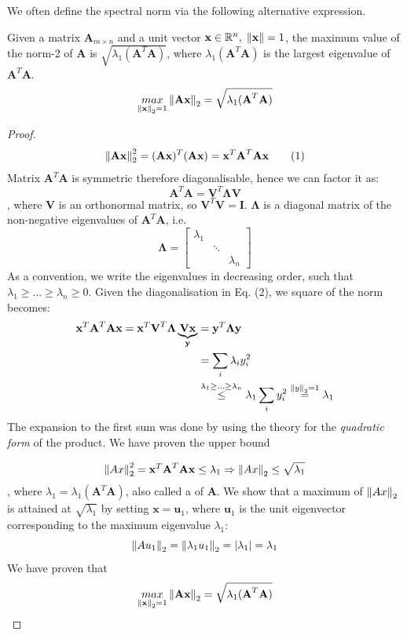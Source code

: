 \documentclass[a4paper]{article}
\begin{document}
We often define the spectral norm via the following alternative expression.
\begin{lemma}
Given a matrix $\textbf{A}_{m\times n}$ and a unit vector $\textbf{x} \in \mathbb{R}^n, \; \left\lVert\textbf{x}\right\rVert=1$, the maximum value of the norm-2 of $\textbf{A}$ is $\sqrt{\lambda_{1}(\textbf{A}^T\textbf{A})}$, where  $\lambda_{1}(\textbf{A}^T\textbf{A})$ is the largest eigenvalue of $\textbf{A}^T\textbf{A}$. 
\begin{equation}
    \underset{\left\lVert\textbf{x}\right\rVert_2=1}{max}\left\lVert\textbf{Ax}\right\rVert_2 = \sqrt{\lambda_{1}(\textbf{A}^T\textbf{A})}
\end{equation}
\end{lemma}
\begin{proof}
\[
\left\lVert\textbf{Ax}\right\rVert_2^2 = (\textbf{Ax})^T(\textbf{Ax})= \textbf{x}^T\textbf{A}^T\textbf{Ax}  \tag{1}
\]
Matrix $\textbf{A}^T\textbf{A}$ is symmetric therefore diagonalisable, hence we can factor it as:
\[
\textbf{A}^T\textbf{A} = \textbf{V}^T\boldsymbol{\Lambda}\textbf{V}   \tag{2}
\]
, where $\textbf{V}$ is an orthonormal matrix, so $\textbf{V}^T\textbf{V}= \textbf{I}$. $\boldsymbol{\Lambda}$ is a diagonal matrix of the non-negative eigenvalues of $\textbf{A}^T\textbf{A}$, i.e.
\[
\boldsymbol{\Lambda} =
\begin{bmatrix}
\lambda_1 & & \\
 & \ddots & \\
 & & \lambda_n
\end{bmatrix}
\]
As a convention, we write the eigenvalues in decreasing order, such that $\lambda_1\geq \ldots \geq \lambda_n \geq 0$. Given the diagonalisation in Eq. (2), we square of the norm becomes:
\[
\begin{split}
\textbf{x}^T\textbf{A}^T\textbf{Ax} = \textbf{x}^T\textbf{V}^T\boldsymbol{\Lambda}\underbrace{\textbf{Vx}}_{\textbf{y}}&=\textbf{y}^T\boldsymbol{\Lambda}\textbf{y} \\
& = \sum\limits_{i}\lambda_i y_i^2\\
& \stackrel{\lambda_1\geq \ldots \geq \lambda_n}{\leq} \lambda_1 \sum\limits_{i}y_i^2 \stackrel{\left\lVert y\right\rVert_2=1}{=} \lambda_1
\end{split}
\]
The expansion to the first sum was done by using the theory for the \textit{quadratic form} of the product. We have proven the upper bound

\begin{gather*}
\left\lVert Ax\right\rVert_2^2 = \textbf{x}^T\textbf{A}^T\textbf{Ax} \leq \lambda_1 \Rightarrow
\left\lVert Ax\right\rVert_2 \leq \sqrt{\lambda_1}
\end{gather*}
, where $\lambda_1 = \lambda_1(\textbf{A}^T\textbf{A})$, also called a  of $\textbf{A}$. We show that a maximum of $\left\lVert Ax\right\rVert_2$ is attained at $\sqrt{\lambda_1}$ by setting $\textbf{x}=\textbf{u}_1$, where $\textbf{u}_1$ is the unit eigenvector corresponding to the maximum eigenvalue $\lambda_1$:
\[
\left\lVert Au_1\right\rVert_2 = \left\lVert\lambda_1u_1\right\rVert_2 = \left|\lambda_1 \right| = \lambda_1
\]
We have proven that
\[
\underset{\left\lVert\textbf{x}\right\rVert_2=1}{max}\left\lVert\textbf{Ax}\right\rVert_2 = \sqrt{\lambda_{1}(\textbf{A}^T\textbf{A})}
\]
\end{proof}
\end{document}
